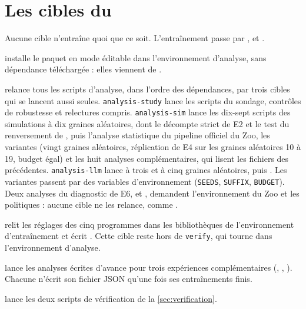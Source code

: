 \section{Les cibles du }
\label{sec:make}

Aucune cible n'entraîne quoi que ce soit. L'entraînement passe par ,
 et .

\begin{description}[style=nextline,leftmargin=1.5em]
  \item[\texttt{make install}] installe le paquet en mode éditable dans l'environnement d'analyse,
        sans dépendance téléchargée : elles viennent de .
  \item[\texttt{make analysis}] relance tous les scripts d'analyse, dans l'ordre des dépendances, par trois
        cibles qui se lancent aussi seules.
        \texttt{analysis-study} lance les scripts du sondage, contrôles de robustesse et relectures compris.
        \texttt{analysis-sim} lance les dix-sept scripts des simulations à dix graines aléatoires, dont le
        décompte strict de E2 et le test du renversement de , puis l'analyse statistique du
        pipeline officiel du Zoo, les variantes (vingt graines aléatoires, réplication de
        E4 sur les graines aléatoires 10 à 19, budget égal) et les huit analyses complémentaires, qui lisent
        les fichiers des précédentes. \texttt{analysis-llm} lance  à trois et à cinq graines
        aléatoires, puis . Les variantes passent par des variables
        d'environnement (\texttt{SEEDS}, \texttt{SUFFIX}, \texttt{BUDGET}). Deux analyses du diagnostic de E6,
         et , demandent l'environnement du Zoo et les politiques :
        aucune cible ne les relance, comme .
  \item[\texttt{make hyperparams}] relit les réglages des cinq programmes dans les bibliothèques de
        l'environnement d'entraînement et écrit . Cette cible
        reste hors de \texttt{verify}, qui tourne dans l'environnement d'analyse.
  \item[\texttt{make analysis-suite}] lance les analyses écrites d'avance pour trois expériences complémentaires
        (, , ). Chacune n'écrit son fichier JSON
        qu'une fois ses entraînements finis.
  \item[\texttt{make check}] lance les deux scripts de vérification de la \cref{sec:verification}.

\end{description}
